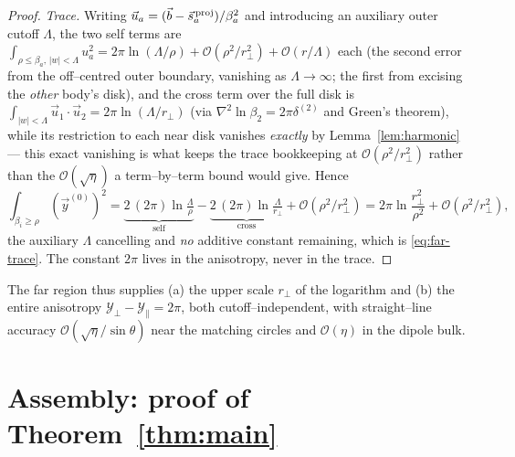 \documentclass[11pt]{article}
\newcommand{\rp}{r_\perp}
\newcommand{\bv}{\vec b}
\newcommand{\Yp}{\mathcal Y_\perp}
\newcommand{\Ypa}{\mathcal Y_\parallel}
\newcommand{\order}[1]{\mathcal O\!\left(#1\right)}
\begin{document}
\begin{proof}
\emph{Trace.} Writing $\vec u_a=(\bv-\vec s_a^{\,\rm proj})/\beta_a^2$ and introducing an auxiliary
outer cutoff $\Lambda$, the two self terms are
$\int_{\rho\le\beta_a,\,|w|<\Lambda}u_a^2=2\pi\ln(\Lambda/\rho)+\order{\rho^2/\rp^2}+\order{r/\Lambda}$
each (the second error from the off--centred outer boundary, vanishing as $\Lambda\to\infty$; the
first from excising the \emph{other} body's disk), and the cross term over the full disk is
$\int_{|w|<\Lambda}\vec u_1\!\cdot\!\vec u_2=2\pi\ln(\Lambda/\rp)$ (via
$\nabla^2\ln\beta_2=2\pi\delta^{(2)}$ and Green's theorem), while its restriction to each near disk
vanishes \emph{exactly} by Lemma~\ref{lem:harmonic} --- this exact vanishing is what keeps the trace
bookkeeping at $\order{\rho^2/\rp^2}$ rather than the $\order{\sqrt\eta}$ a term--by--term bound
would give. Hence
\begin{equation*}
  \int_{\beta_i\ge\rho}(\vec y^{(0)})^2
  =\underbrace{2\,(2\pi)\ln\tfrac{\Lambda}{\rho}}_{\text{self}}
   -\underbrace{2\,(2\pi)\ln\tfrac{\Lambda}{\rp}}_{\text{cross}}
   +\order{\rho^2/\rp^2}
  =2\pi\ln\frac{\rp^2}{\rho^2}+\order{\rho^2/\rp^2},
\end{equation*}
the auxiliary $\Lambda$ cancelling and \emph{no} additive constant remaining, which is
\eqref{eq:far-trace}. The constant $2\pi$ lives in the anisotropy, never in the trace.
\end{proof}

The far region thus supplies (a) the upper scale $\rp$ of the logarithm and (b) the entire
anisotropy $\Yp-\Ypa=2\pi$, both cutoff--independent, with straight--line accuracy
$\order{\sqrt\eta/\sin\theta}$ near the matching circles and $\order{\eta}$ in the dipole bulk.

\section{Assembly: proof of Theorem~\ref{thm:main}}
\label{sec:assemble}
\end{document}
